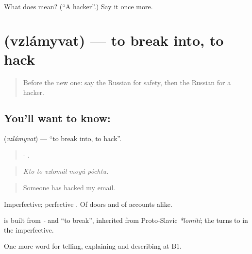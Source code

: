 \begin{tcolorbox}[breakable,colback=teal!4,colframe=teal!35!black,title={Before you move on}]
What does  mean? (\textquotedblleft{}A hacker\textquotedblright{}.) Say it once more.
\end{tcolorbox}
\section[\texorpdfstring{\ru{взламывать} (vzlámyvat)}{взламывать (vzlámyvat)}]{ (vzlámyvat) — to break into, to hack}

\label{lesson:RU-C400-vzlamyvat}



\begin{quote}
Before the new one: say the Russian for safety, then the Russian for a hacker.
\end{quote}

\subsection*{You'll want to know: }
\textbf{} (\emph{vzlámyvat}) — \textquotedblleft{}to break into, to hack\textquotedblright{}.

\begin{quote}
-   .
\end{quote}

\begin{quote}
\emph{Kto-to vzlomál moyú póchtu.}
\end{quote}

\begin{quote}
Someone has hacked my email.
\end{quote}

Imperfective; perfective \emph{}. Of doors and of accounts alike.

\begin{cousinweb}
\textbf{} is built from \emph{-} and \emph{} \textquotedblleft{}to break\textquotedblright{}, inherited from Proto-Slavic \emph{*lomiti}; the \emph{} turns to \emph{} in the imperfective.
\end{cousinweb}

\begin{grammarlens}[title={What you've built}]
One more word for telling, explaining and describing at B1.
\end{grammarlens}

